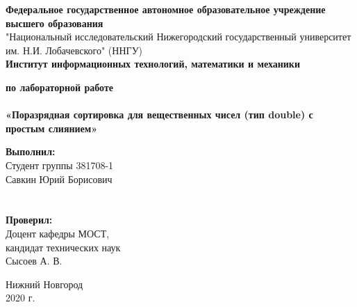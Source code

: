 \documentclass{report}
\begin{document}
    \begin{titlepage}

        \begin{center}
            \textbf{Федеральное государственное автономное образовательное учреждение высшего образования} \\
            "Национальный исследовательский Нижегородский государственный университет им. Н.И. Лобачевского" (ННГУ) \\
            \textbf{Институт информационных технологий, математики и механики}

            \vspace{\fill}

            \textbf{ по лабораторной работе \\}
            \textbf{\large\\ «Поразрядная сортировка для вещественных чисел (тип double) с простым слиянием»}

            \vspace{\fill}

            \hfill\parbox{8cm}
            {
                \hspace*{5cm}\hspace*{-5cm}\textbf{Выполнил:} \\ Студент группы 381708-1 \\ Савкин Юрий Борисович \\ \\ \\
                \hspace*{5cm}\hspace*{-5cm}\textbf{Проверил:}\\ Доцент кафедры МОСТ, \\ кандидат технических наук \\ Сысоев А. В.
            }

            \vspace{\fill}

            Нижний Новгород \\ 2020 г.
        \end{center}

    \end{titlepage}


    \setcounter{page}{2}
    \setlength{\cftsecindent}{0em}
    \setlength{\cftsubsecindent}{1.25em}
    \setlength{\cftsubsubsecindent}{2.5em}
    \setlength{\cftsubsubsecnumwidth}{1.25em}
    \tableofcontents


    \newpage
\end{document}
